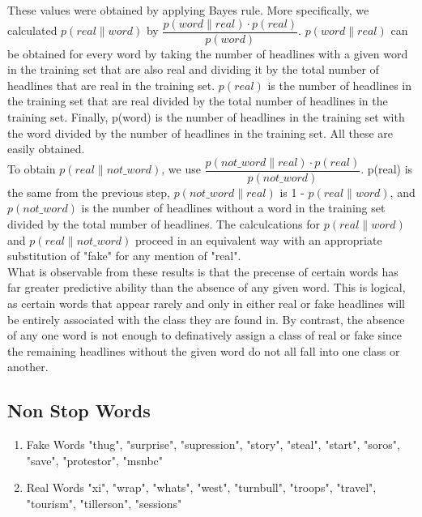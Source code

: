 \documentclass{article}
\begin{document}
   These values were obtained by applying Bayes rule. More specifically, we calculated $p(real \| word)$ by
   $ \dfrac {p(word \| real) \cdot p(real)}{p(word)}$. $p(word \| real)$ can be obtained for every word by taking
   the number of headlines with a given word in the training set that are also real and dividing it by the
   total number of headlines that are real in the training set. $p(real)$ is the number of headlines in the
   training set that are real divided by the total number of headlines in the training set. Finally, p(word) is
   the number of headlines in the training set with the word divided by the number of headlines in the training set.
   All these are easily obtained.
   \\
   To obtain $p(real \| not\_word)$, we use $ \dfrac {p(not\_word \| real) \cdot p(real)}{p(not\_word)}$. p(real)
   is the same from the previous step, $p(not\_word \| real)$ is 1 - $p(real \| word)$, and $p(not\_word)$ is the
   number of headlines without a word in the training  set divided by the total number of headlines.
   The calculcations for $p(real \| word)$ and $p(real \| not\_word)$ proceed in an equivalent way with an
   appropriate substitution of "fake" for any mention of "real".
   \\
  


   What is observable from these results is that the precense of certain words has far greater predictive ability
   than the absence of any given word. This is logical, as certain words that appear rarely and only in either
   real or fake headlines will be entirely associated with the class they are found in. By contrast, the
   absence of any one word is not enough to definatively assign a class of real or fake since the remaining
   headlines without the given word do not all fall into one class or another.

   \subsection{Non Stop Words}
   \begin{enumerate}
\item Fake Words
"thug", "surprise", "supression", "story", "steal", "start", "soros", "save", "protestor", "msnbc"
\item Real Words
	"xi", "wrap", "whats", "west", "turnbull", "troops", "travel", "tourism", "tillerson", "sessions"

   \end{enumerate}
\end{document}
